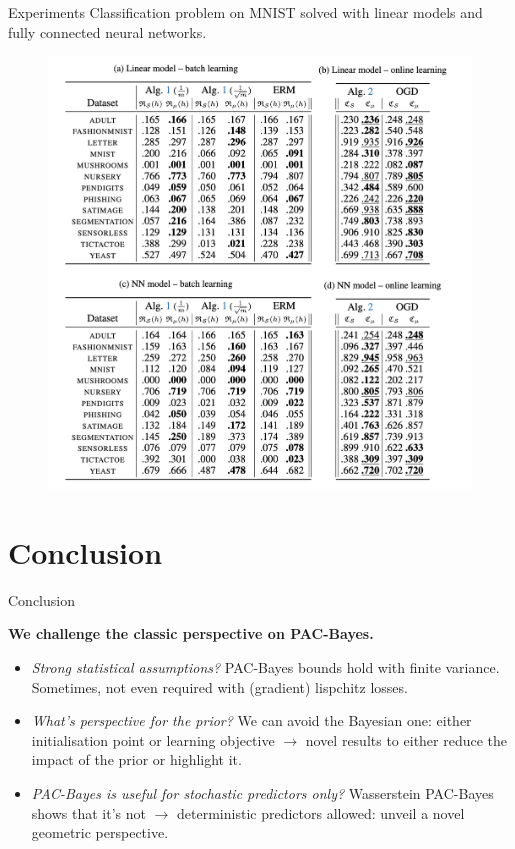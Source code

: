 \documentclass{presentation}
\begin{document}
\begin{xframe}{Experiments}
    Classification problem on MNIST solved with linear models and fully connected neural networks.
    \begin{figure}
        \centering
        \includegraphics[scale=0.35]{figures/tables.png}
    \end{figure}
    
\end{xframe}

\section{Conclusion}

\begin{xframe}{Conclusion}
    \vspace{0.5cm}
    \begin{blackblock}{}
        {\bf\Large We challenge the classic perspective on PAC-Bayes.}
    \end{blackblock}
    \vspace{0.5cm}
    \begin{itemize}
        \item \emph{Strong statistical assumptions?} PAC-Bayes bounds hold with finite variance. Sometimes, not even required with (gradient) lispchitz losses. 
        \item \emph{What's perspective for the prior?} We can avoid the Bayesian one: either initialisation point or learning objective $\rightarrow$ novel results to either reduce the impact of the prior or highlight it.
        \item \emph{ PAC-Bayes is useful for stochastic predictors only?} Wasserstein PAC-Bayes shows that it's not $\rightarrow$ deterministic predictors allowed: unveil a novel geometric perspective.
    \end{itemize}
\end{xframe}
\end{document}
